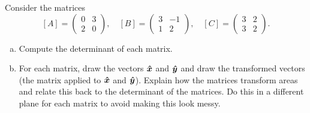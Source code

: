 \documentclass[12pt]{article} %
\begin{document}
\newpage
\begin{problem}
Consider the matrices
\[
[A] = \begin{pmatrix} 0 & 3 \\ 2 & 0 \end{pmatrix}, \quad [B] = \begin{pmatrix} 3 & -1 \\ 1 & 2 \end{pmatrix}, \quad [C] = \begin{pmatrix} 3 & 2 \\ 3 & 2 \end{pmatrix}.
\]
\begin{enumerate}[(a)]
    \item Compute the determinant of each matrix.
    \item For each matrix, draw the vectors $\boldsymbol{\hat{x}}$ and $\boldsymbol{\hat{y}}$ and draw the transformed vectors (the matrix applied to $\boldsymbol{\hat{x}}$ and $\boldsymbol{\hat{y}}$). Explain how the matrices transform areas and relate this back to the determinant of the matrices.  Do this in a different plane for each matrix to avoid making this look messy.
\end{enumerate}
\end{problem}
\end{document}
